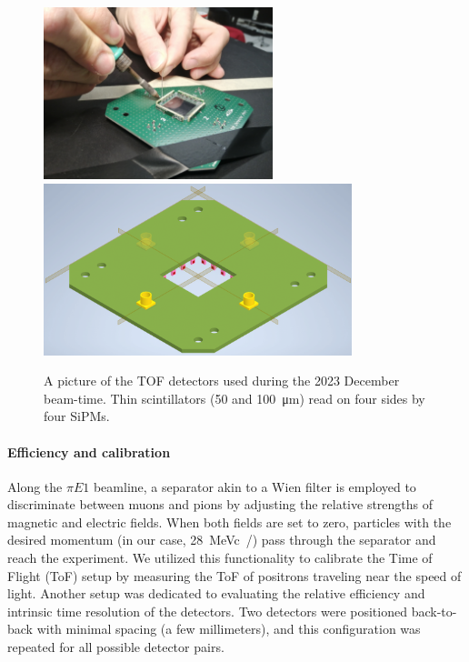\begin{refsection}
        \begin{figure}
            \centering
            \includegraphics[height=5cm]{Figures/muEDM_Dec2023/TOF_soldering.jpg}
            \includegraphics[height=5cm]{Figures/muEDM_Dec2023/TOF_CAD.png}
            \caption[muEDM 2023: TOF detector soldering.]{A picture of the TOF detectors used during the 2023 December beam-time. Thin scintillators (50 and \SI{100}{\micro m}) read on four sides by four SiPMs.}
            \label{fig:muEDM:bt2023:TOF:picture}
        \end{figure}

        \paragraph{Efficiency and calibration}
        Along the $\pi E1$ beamline, a separator akin to a Wien filter is employed to discriminate between muons and pions by adjusting the relative strengths of magnetic and electric fields. 
        When both fields are set to zero, particles with the desired momentum (in our case, \SI{28}{MeVc/}) pass through the separator and reach the experiment. 
        We utilized this functionality to calibrate the Time of Flight (ToF) setup by measuring the ToF of positrons traveling near the speed of light.
        Another setup was dedicated to evaluating the relative efficiency and intrinsic time resolution of the detectors. Two detectors were positioned back-to-back with minimal spacing (a few millimeters), and this configuration was repeated for all possible detector pairs.


\end{refsection}
